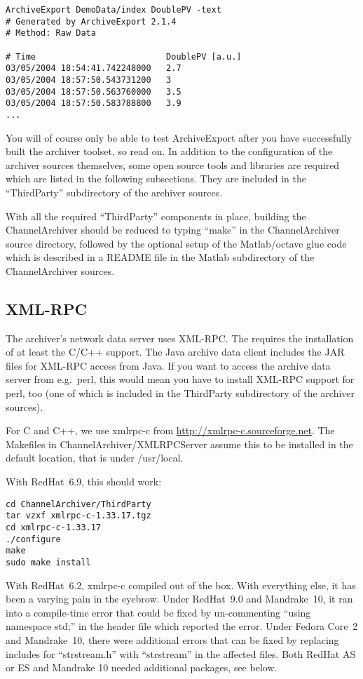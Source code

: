 \begin{lstlisting}[keywordstyle=\sffamily]
ArchiveExport DemoData/index DoublePV -text
# Generated by ArchiveExport 2.1.4
# Method: Raw Data

# Time                          DoublePV [a.u.]
03/05/2004 18:54:41.742248000   2.7
03/05/2004 18:57:50.543731200   3
03/05/2004 18:57:50.563760000   3.5
03/05/2004 18:57:50.583788800   3.9
...
\end{lstlisting}

\noindent You will of course only be able to test ArchiveExport after you
have successfully built the archiver toolset, so read on.
In addition to the configuration of the archiver sources
themselves, some open source tools and libraries are required which
are listed in the following subsections. They are included in the
``ThirdParty'' subdirectory of the archiver sources.

With all the required ``ThirdParty'' components in place, building the
ChannelArchiver should be reduced to typing ``make'' in the
ChannelArchiver source directory, followed by the optional setup of the
Matlab/octave glue code which is described in a README file in the
Matlab subdirectory of the ChannelArchiver sources.

\subsection{XML-RPC}
The archiver's network data server uses XML-RPC. The  requires the installation of at least the C/C++ support. The
Java archive data client includes the JAR files for XML-RPC access
from Java. If you want to access the archive data server from e.g.\ perl,
this would mean you have to install XML-RPC support for perl, too
(one of which is included in the ThirdParty subdirectory of the
archiver sources).

For C and C++, we use xmlrpc-c from
\href{http://xmlrpc-c.sourceforge.net}{http://xmlrpc-c.sourceforge.net}.
The Makefiles in ChannelArchiver/XMLRPCServer assume this to be
installed in the default location, that is under /usr/local.

With RedHat~6.9, this should work:
\begin{lstlisting}[keywordstyle=\sffamily]
cd ChannelArchiver/ThirdParty
tar vzxf xmlrpc-c-1.33.17.tgz
cd xmlrpc-c-1.33.17
./configure
make
sudo make install
\end{lstlisting}

With RedHat~6.2, xmlrpc-c compiled out of the box.  With everything else,
it has been a varying pain in the eyebrow. Under RedHat~9.0
and Mandrake~10, it ran into a compile-time error that could be fixed
by un-commenting ``using namespace std;'' in the header file which
reported the error.  Under Fedora Core~2 and Mandrake~10, there were
additional errors that can be fixed by replacing includes for
``strstream.h'' with ``strstream'' in the affected files.  Both RedHat
AS or ES and Mandrake 10 needed additional packages, see below.

